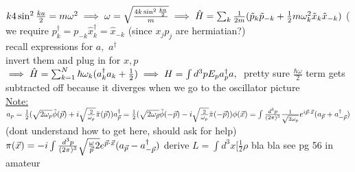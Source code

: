 \documentclass[12pt]{amsart}
\begin{document}
\begin{enumerate}
$k 4 \sin^2 \frac{ka}{2} = m \omega^2\\
\implies \omega= \sqrt{ \frac{4 k \sin^2 \frac{ka}{2}}{m}}\\
\implies \hat{H} = \sum_k \frac{1}{2m} ( \tilde{p}_k \tilde{p}_{-k} + \frac{1}{2} m \omega_k^2 \tilde{x}_k \tilde{x}_{-k})\\$
( we require $p_k^{\dagger} = p_{-k} \hat{x}_k^{\dagger} = \hat{x}_{-k}$ (since $x_j p_j$ are hermiatian?)\\
recall expressions for $a,\,\, a^{\dagger}$\\
invert them and plug in for $x,p$\\
$\implies \hat{H} = \sum_{k=1}^N \hbar \omega_k ( a_k^{\dagger} a_k + \frac{1}{2})\\
\implies H= \int d^3 p E_p a_p^{\dagger} a,\,\,$ pretty sure $\frac{\hbar \omega}{2}$ term gets subtracted off because it diverges when we go to the oscillator picture\\
\underline{Note:} $a_p = \frac{1}{2} ( \sqrt{2 \omega_p} \tilde{\phi} ( \vec{p}) + i \sqrt{ \frac{2}{\omega_p} }\tilde{\pi}(\vec{p}))\\
a_{\vec{p}}^{\dagger} = \frac{1}{2}( \sqrt{2 \omega_{\vec{p}}} \tilde{\phi}( - \vec{p}) - i \sqrt{ \frac{2}{ \omega_p}} \tilde{\pi}(- \vec{p}))\\
\phi( \vec{x}) = \int \frac{d^3 p}{(2 \pi)^3} \frac{1}{\sqrt{2 \omega_p}} e^{i \vec{p} \cdot \vec{x}} ( a_{\vec{p}} + a_{- \vec{p}}^{\dagger})$ (dont understand how to get here, should ask for help)\\
$\pi(\vec{x}) = - i \int \frac{d^3 p}{(2 \pi)^3} \sqrt{ \frac{\omega}{\vec{p}}{2}}e^{\vec{p} \cdot \vec{x}} ( a _{\vec{p}} - a_{- \vec{p}}^{\dagger})\\$
derive $L= \int d^3x [ \frac{1}{2} \rho$ bla bla see pg 56 in amateur\\


\hdashrule[0.5ex][c]{\linewidth}{0.5pt}{1.5mm}



\end{enumerate}
\end{document}
